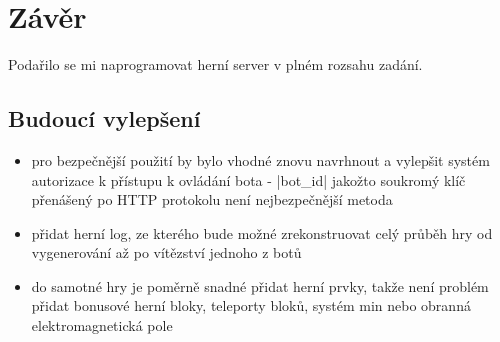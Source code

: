 
\section*{Závěr}

Podařilo se mi naprogramovat herní server v plném rozsahu zadání.

\subsection*{Budoucí vylepšení}

\begin{itemize}
 \item pro bezpečnější použití by bylo vhodné znovu navrhnout a vylepšit systém autorizace k přístupu k ovládání bota - \ic|bot_id| jakožto soukromý klíč přenášený po HTTP protokolu není nejbezpečnější metoda
 \item přidat herní log, ze kterého bude možné zrekonstruovat celý průběh hry od vygenerování až po vítězství jednoho z botů  
 \item do samotné hry je poměrně snadné přidat herní prvky, takže není problém přidat bonusové herní bloky, teleporty bloků, systém min nebo obranná elektromagnetická pole
\end{itemize}

